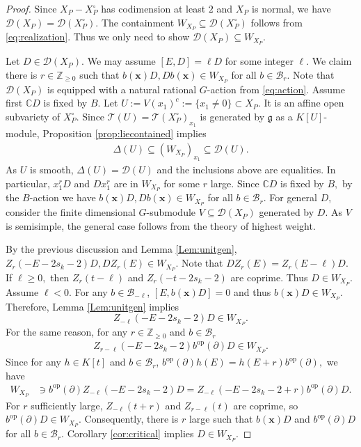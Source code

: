 \documentclass[11pt,a4paper,usenames,dvipsnames,reqno]{amsart}
\numberwithin{equation}{section}
\newcommand{\cc}{\mathbb C}
\newcommand{\zz}{\mathbb Z}
\theoremstyle{definition}
\theoremstyle{remark}
\begin{document}
\begin{proof}
     Since $X_P-X_P^\circ$ has codimension at least $2$ and $X_P$ is normal, we have $\mathcal{D}(X_P)=\mathcal{D}(X_P^\circ)$. The containment $W_{X_P}\subseteq \mathcal{D}(X_P^\circ)$ follows from \eqref{eq:realization}. Thus we only need to show $\mathcal{D}(X_P)\subseteq W_{X_P}.$ 
     
     Let $D\in \mathcal{D}(X_P).$ We may assume $[E,D]=\ell D$ for some integer $\ell$. We claim there is $r\in \zz_{\ge 0}$ such that  $b(\mathbf{x})D, Db(\mathbf{x})\in W_{X_P}$ for all $b\in \mathcal{B}_r$. Note that $\mathcal{D}(X_P)$ is equipped with a natural rational $G$-action from \eqref{eq:action}. Assume first $\cc D$ is fixed by $B$. Let $U:=V(x_1)^c:=\{x_1\neq 0\}\subset X_P.$ It is an affine open subvariety of $X_P^\circ$. Since $\mathcal{T}(U)=\mathcal{T}(X_P^\circ)_{x_1}$ is generated by $\mathfrak{g}$ as a $K[U]$-module, Proposition \ref{prop:liecontained} implies
\begin{align*}
    \Delta(U)\subseteq  (W_{X_P})_{x_1}\subseteq \mathcal{D}(U).
\end{align*}
As $U$ is smooth, $\Delta(U)=\mathcal{D}(U)$ and the inclusions above are equalities. In particular, $x_1^rD$ and $Dx_1^r$ are in $W_{X_P}$ for some $r$ large. Since $\cc D$ is fixed by $B,$ by the $B$-action we have $b(\mathbf{x})D,  Db(\mathbf{x}) \in W_{X_P}$  for all $b\in \mathcal{B}_r.$ For general $D$, consider the finite dimensional $G$-submodule $V\subseteq \mathcal{D}(X_P)$ generated by $D$. As $V$ is semisimple, the general case follows from the theory of highest weight.
     
     
By the previous discussion and Lemma \ref{Lem:unitgen}, $Z_r(-E-2s_k-2)D, DZ_r(E)\in  W_{X_P}.$
Note that $DZ_r(E)=Z_r(E-\ell)D.$ If $\ell\ge 0,$ then $Z_{r}(t-\ell)$ and $Z_{r}(-t-2s_k-2)$ are coprime. Thus $D\in W_{X_P}$. Assume $\ell<0$. For any $b\in \mathcal{B}_{-\ell}$, $[E,b(\mathbf{x})D]=0$ and thus  $b(\mathbf{x}) D\in W_{X_P}.$ Therefore, Lemma \ref{Lem:unitgen} implies $$Z_{-\ell}(-E-2s_k-2)D\in W_{X_P}.$$ For the same reason, for any $r\in \zz_{\ge 0}$ and $b\in \mathcal{B}_r$
\begin{align*}
    Z_{r-\ell}(-E-2s_k-2)b^{\mathrm{op}}(\partial)D\in W_{X_P}.
\end{align*}
Since for any $h\in K[t]$ and $b\in \mathcal{B}_r$, $b^{\mathrm{op}}(\partial)h(E)=h(E+r)b^{\mathrm{op}}(\partial),$
we have
\begin{align*}
    W_{X_P}&\ni b^{\mathrm{op}}(\partial)Z_{-\ell}(-E-2s_k-2)D=Z_{-\ell}(-E-2s_k-2+r)b^{\mathrm{op}}(\partial)D.
\end{align*}
For $r$ sufficiently large, $Z_{-\ell}(t+r)$ and $Z_{r-\ell}(t)$ are coprime, so $b^{\mathrm{op}}(\partial)D\in W_{X_P}$. Consequently, there is $r$ large such that $b(\mathbf{x})D$ and $b^{\mathrm{op}}(\partial)D$ for all $b\in \mathcal{B}_r$. Corollary \ref{cor:critical} implies $D\in W_{X_P}$.
\end{proof}
\end{document}
